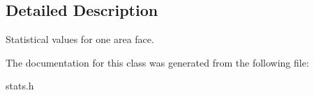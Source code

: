 \subsection{Detailed Description}
Statistical values for one area face. 

The documentation for this class was generated from the following file\+:\begin{DoxyCompactItemize}
\item 
stats.\+h\end{DoxyCompactItemize}
